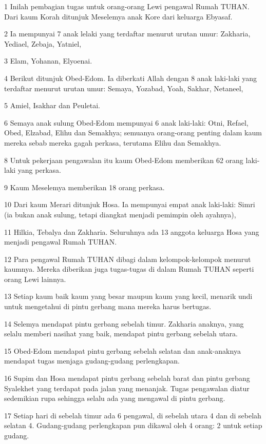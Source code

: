 \par 1 Inilah pembagian tugas untuk orang-orang Lewi pengawal Rumah TUHAN. Dari kaum Korah ditunjuk Meselemya anak Kore dari keluarga Ebyasaf.
\par 2 Ia mempunyai 7 anak lelaki yang terdaftar menurut urutan umur: Zakharia, Yediael, Zebaja, Yatniel,
\par 3 Elam, Yohanan, Elyoenai.
\par 4 Berikut ditunjuk Obed-Edom. Ia diberkati Allah dengan 8 anak laki-laki yang terdaftar menurut urutan umur: Semaya, Yozabad, Yoah, Sakhar, Netaneel,
\par 5 Amiel, Isakhar dan Peuletai.
\par 6 Semaya anak sulung Obed-Edom mempunyai 6 anak laki-laki: Otni, Refael, Obed, Elzabad, Elihu dan Semakhya; semuanya orang-orang penting dalam kaum mereka sebab mereka gagah perkasa, terutama Elihu dan Semakhya.
\par 8 Untuk pekerjaan pengawalan itu kaum Obed-Edom memberikan 62 orang laki-laki yang perkasa.
\par 9 Kaum Meselemya memberikan 18 orang perkasa.
\par 10 Dari kaum Merari ditunjuk Hosa. Ia mempunyai empat anak laki-laki: Simri (ia bukan anak sulung, tetapi diangkat menjadi pemimpin oleh ayahnya),
\par 11 Hilkia, Tebalya dan Zakharia. Seluruhnya ada 13 anggota keluarga Hosa yang menjadi pengawal Rumah TUHAN.
\par 12 Para pengawal Rumah TUHAN dibagi dalam kelompok-kelompok menurut kaumnya. Mereka diberikan juga tugas-tugas di dalam Rumah TUHAN seperti orang Lewi lainnya.
\par 13 Setiap kaum baik kaum yang besar maupun kaum yang kecil, menarik undi untuk mengetahui di pintu gerbang mana mereka harus bertugas.
\par 14 Selemya mendapat pintu gerbang sebelah timur. Zakharia anaknya, yang selalu memberi nasihat yang baik, mendapat pintu gerbang sebelah utara.
\par 15 Obed-Edom mendapat pintu gerbang sebelah selatan dan anak-anaknya mendapat tugas menjaga gudang-gudang perlengkapan.
\par 16 Supim dan Hosa mendapat pintu gerbang sebelah barat dan pintu gerbang Syalekhet yang terdapat pada jalan yang menanjak. Tugas pengawalan diatur sedemikian rupa sehingga selalu ada yang mengawal di pintu gerbang.
\par 17 Setiap hari di sebelah timur ada 6 pengawal, di sebelah utara 4 dan di sebelah selatan 4. Gudang-gudang perlengkapan pun dikawal oleh 4 orang: 2 untuk setiap gudang.
